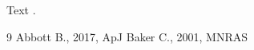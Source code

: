 \documentclass{article}
\begin{document}
Text \cite{a}.
\begin{thebibliography}{9}
 Abbott B., 2017, ApJ
 Baker C., 2001, MNRAS
\end{thebibliography}
\end{document}
